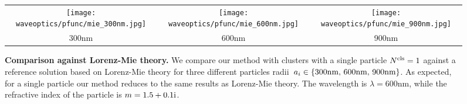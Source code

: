 \begin{figure}[h]
    \centering
    \setlength{\resLen}{2.2in}
    \addtolength{\tabcolsep}{-6pt}
    \begin{tabular}{ccc}
        \texttt{[image: waveoptics/pfunc/mie\_300nm.jpg]} & 
        \texttt{[image: waveoptics/pfunc/mie\_600nm.jpg]} &  
        \texttt{[image: waveoptics/pfunc/mie\_900nm.jpg]} 
        \\ 
        300nm & 600nm & 900nm
    \end{tabular}
    \caption[Comparison against Lorenz-Mie theory]{\label{fig:waveoptics:mie}
    	\textbf{Comparison against Lorenz-Mie theory.} We compare our method with clusters with a single particle ${N^\text{cls}}=1$ against a reference solution based on Lorenz-Mie theory for three different particles radii~$a_i \in \{ \text{300nm, 600nm, 900nm} \}$. As expected, for a single particle our method reduces to the same results as Lorenz-Mie theory. The wavelength is $\lambda=600$nm, while the refractive index of the particle is $m=1.5+0.1\text{i}$.  
	}
\end{figure}
